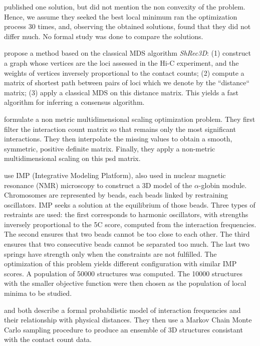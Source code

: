 \citet{tanizawa:mapping} published one solution, but did not mention the non
convexity of the problem. Hence, we assume they seeked the best local minimum
\citet{duan:three-dimensional} ran the optimization process 30 times, and, observing the
obtained solutions, found that they did not differ much. No formal study was
done to compare the solutions.

\citet{lesne:3d} propose a method based on the classical MDS algorithm
\textit{ShRec3D}:
(1) construct a graph whose vertices are the loci assessed in the Hi-C
experiment, and the weights of vertices inversely proportional to the contact
counts; (2) compute a matrix of shortest path between pairs of loci which we
denote by the ``distance`` matrix; (3) apply a classical MDS on this distance
matrix. This yields a fast algorithm for inferring a consensus algorithm.

\citet{ben-elazar:spatial} formulate a non metric multidimensional scaling
optimization problem. They first filter the interaction count matrix so that
remains only the most significant interactions. They then interpolate the
missing values to obtain a smooth, symmetric, positive definite matrix.
Finally, they apply a non-metric multidimensional scaling on this psd
matrix.

\citet{bau:three-dimensional} use IMP (Integrative Modeling Platform), also
used in nuclear magnetic resonance (NMR) microscopy to construct a 3D model of
the $\alpha$-globin module. Chromosomes are represented by beads, each beads
linked by restraining oscillators. IMP seeks a solution at the equilibrium of
those beads. Three types of restraints are used: the first  corresponds to
harmonic oscillators, with strengths inversely proportional to the 5C
score, computed from the interaction frequencies. The second ensures that two
beads cannot be too close to each other. The third ensures that two consecutive
beads cannot be separated too much. The last two springs have strength only
when the constraints are not fulfilled. The optimization of this problem
yields different configuration with similar IMP scores. A population of 50000
structures was computed. The 10000 structures with the smaller objective
function were then chosen as the population of local minima to be studied.

\citet{rousseau:three} and \citet{hu:bayesian} both describe a formal
probabilistic model of interaction frequencies and their relationship with
physical distances. They then use a Markov Chain Monte Carlo sampling
procedure to produce an ensemble of 3D structures consistant with the contact
count data.

